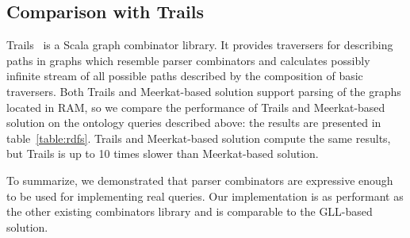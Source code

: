 \subsection{Comparison with Trails}

Trails~\cite{ScalaGraphParsing} is a Scala graph combinator library.
It provides traversers for describing paths in graphs which resemble parser combinators and calculates possibly infinite stream of all possible paths described by the composition of basic traversers.
Both Trails and Meerkat-based solution support parsing of the graphs located in RAM, so we compare the performance of Trails and Meerkat-based solution on the ontology queries described above: the results are presented in table~\ref{table:rdfs}.
Trails and Meerkat-based solution compute the same results, but Trails is up to 10 times slower than Meerkat-based solution.

To summarize, we demonstrated that parser combinators are expressive enough to be used for implementing real queries. 
Our implementation is as performant as the other existing combinators library and is comparable to the GLL-based solution.
